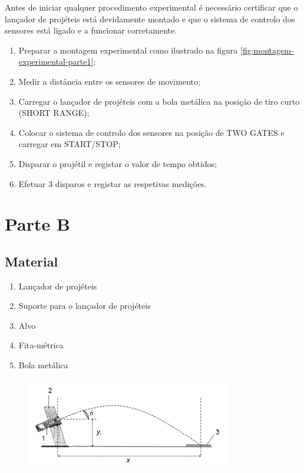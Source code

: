 {Antes de iniciar qualquer procedimento experimental é necessário certificar que o lançador de projéteis está devidamente montado e que o sistema de controlo dos sensores está ligado e a funcionar corretamente.

\begin{enumerate}
    \item Preparar a montagem experimental como ilustrado na figura \ref{fig:montagem-experimental-parte1};
    \item Medir a distância entre os sensores de movimento;
    \item Carregar o lançador de projéteis com a bola metálica na posição de tiro curto (SHORT RANGE);
    \item Colocar o sistema de controlo dos sensores na posição de TWO GATES e carregar em START/STOP;
    \item Disparar o projétil e registar o valor de tempo obtidos;
    \item Efetuar 3 disparos e registar as respetivas medições.
\end{enumerate}

\pagebreak

\section{Parte B}
\label{sec:detalhes-experimentais-relevantes-parte2}

\subsection{Material}
\label{subsec:detalhes-experimentais-relevantes-parte2-material}

\begin{enumerate}
    \item Lançador de projéteis
    \item Suporte para o lançador de projéteis
    \item Alvo
    \item Fita-métrica
    \item Bola metálica
\end{enumerate}

\begin{figure}[h]
    \center
    \includegraphics[width=0.8\textwidth]{images/montagem-experimental-parte2}\label{fig:montagem-experimental-parte2}
\end{figure}

}
